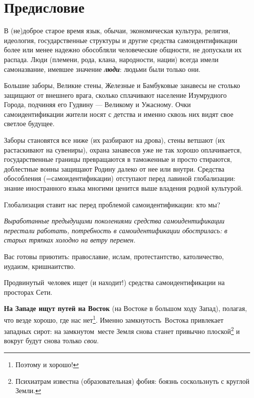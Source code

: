 %
\section[Предисловие]{Предисловие}
В (не)доброе старое время язык, обычаи, экономическая культура, религия, идеология, государственные структуры и другие
средства самоидентификации более или менее надежно обособляли человеческие общности, не допускали их распада. Люди
(племени, рода, клана, народности, нации) всегда имели самоназвание, имевшее значение \textbf{\textit{люди}}: людьми
были только они.

Большие заборы, Великие стены, Железные и Бамбуковые занавесы не столько защищают от внешнего врага, сколько сплачивают
население Изумрудного Города, подчиняя его Гудвину — Великому и Ужасному. Очки самоидентификации жители носят с детства
и именно сквозь них видят свое светлое будущее.

Заборы становятся все ниже (их разбирают на дрова), стены ветшают (их растаскивают на сувениры), охрана занавесов уже не
так хорошо оплачивается, государственные границы превращаются в таможенные и просто стираются, доблестные воины
защищают Родину далеко от нее или внутри. Средства обособления (=самоидентификации) отступают перед лавиной
\flqq глобализации\frqq: знание иностранного языка многими ценится выше владения родной культурой.

Глобализация ставит нас перед проблемой самоидентификации: кто мы?

\textit{Выработанные предыдущими поколениями средства самоидентификации перестали работать, потребность в самоидентификации
обострилась: в старых тряпках холодно на ветру перемен.}

Вас готовы приютить: православие, ислам, протестантство, католичество, иудаизм, кришнаитство.

\flqq Продвинутый\frqq\ человек ищет (и находит!) средства самоидентификации на просторах Сети.

\textbf{На Западе ищут путей на Восток} (на Востоке в большом ходу Запад), полагая, что \flqq везде хорошо, где нас
нет\frqq\footnote{Поэтому и хорошо!}. Именно \flqq замкнутость\frqq\ Востока привлекает западных сирот:
на \flqq замкнутом\frqq\ месте Земля снова станет привычно
плоской\footnote{Психиатрам известна (образовательная) фобия: боязнь соскользнуть с круглой Земли.} и вокруг будут снова только \textit{свои}.

